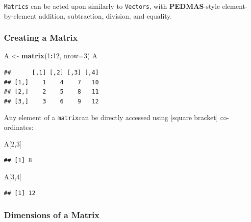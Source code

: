 \documentclass[]{book}
\newenvironment{Shaded}{\begin{snugshade}}{\end{snugshade}}
\newcommand{\DataTypeTok}[1]{\textcolor[rgb]{0.13,0.29,0.53}{#1}}
\newcommand{\DecValTok}[1]{\textcolor[rgb]{0.00,0.00,0.81}{#1}}
\newcommand{\KeywordTok}[1]{\textcolor[rgb]{0.13,0.29,0.53}{\textbf{#1}}}
\newcommand{\NormalTok}[1]{#1}
\newcommand{\OperatorTok}[1]{\textcolor[rgb]{0.81,0.36,0.00}{\textbf{#1}}}
\newcommand{\StringTok}[1]{\textcolor[rgb]{0.31,0.60,0.02}{#1}}
\theoremstyle{definition}
\theoremstyle{definition}
\theoremstyle{definition}
\theoremstyle{remark}
\begin{document}
\texttt{Matrics} can be acted upon similarly to \texttt{Vectors}, with
\textbf{PEDMAS}-style element-by-element addition, subtraction,
division, and equality.

\hypertarget{creating-a-matrix}{%
\subsubsection{Creating a Matrix}\label{creating-a-matrix}}

\begin{Shaded}
\begin{Highlighting}[]
\NormalTok{A <-}\StringTok{ }\KeywordTok{matrix}\NormalTok{(}\DecValTok{1}\OperatorTok{:}\DecValTok{12}\NormalTok{, }\DataTypeTok{nrow=}\DecValTok{3}\NormalTok{)}
\NormalTok{A}
\end{Highlighting}
\end{Shaded}

\begin{verbatim}
##      [,1] [,2] [,3] [,4]
## [1,]    1    4    7   10
## [2,]    2    5    8   11
## [3,]    3    6    9   12
\end{verbatim}

Any element of a \texttt{matrix}can be directly accessed using {[}square
bracket{]} co-ordinates:

\begin{Shaded}
\begin{Highlighting}[]
\NormalTok{A[}\DecValTok{2}\NormalTok{,}\DecValTok{3}\NormalTok{]}
\end{Highlighting}
\end{Shaded}

\begin{verbatim}
## [1] 8
\end{verbatim}

\begin{Shaded}
\begin{Highlighting}[]
\NormalTok{A[}\DecValTok{3}\NormalTok{,}\DecValTok{4}\NormalTok{]}
\end{Highlighting}
\end{Shaded}

\begin{verbatim}
## [1] 12
\end{verbatim}

\hypertarget{dimensions-of-a-matrix}{%
\subsubsection{Dimensions of a Matrix}\label{dimensions-of-a-matrix}}
\end{document}
